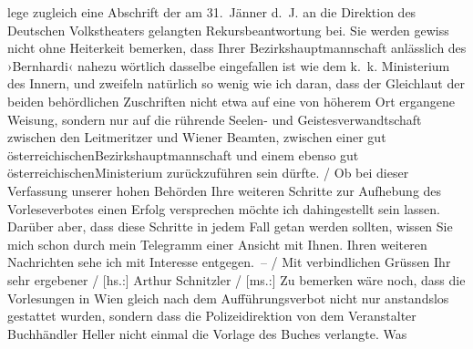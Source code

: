 {{{                        lege zugleich eine Abschrift der am 31. Jänner d. J. an die
                        Direktion des Deutschen Volkstheaters
                        gelangten Rekursbeantwortung bei. Sie werden gewiss nicht ohne Heiterkeit
                        bemerken, dass Ihrer Bezirkshauptmannschaft anlässlich des ›Bernhardi‹ nahezu wörtlich dasselbe eingefallen ist
                        wie dem k. k. Ministerium des Innern,
                        und zweifeln natürlich so wenig wie ich daran, dass der Gleichlaut der
                        beiden behördlichen Zuschriften nicht etwa auf eine von höherem Ort
                        ergangene Weisung, sondern nur auf die rührende Seelen- und
                        Geistesverwandtschaft zwischen den Leitmeritzer und Wiener Beamten,
                        zwischen einer gut österreichischenBezirkshauptmannschaft und einem ebenso gut österreichischenMinisterium
                        zurückzuführen sein dürfte.{ / }Ob bei dieser Verfassung unserer hohen
                        Behörden Ihre weiteren Schritte zur Aufhebung des Vorleseverbotes einen
                        Erfolg versprechen möchte ich dahingestellt sein lassen. Darüber aber, dass
                        diese Schritte in jedem Fall getan werden sollten, wissen Sie mich schon
                        durch mein Telegramm einer Ansicht mit Ihnen. Ihren weiteren Nachrichten
                        sehe ich mit Interesse entgegen. –{ / }Mit verbindlichen Grüssen Ihr sehr ergebener{ / }{[}hs.:{]} Arthur Schnitzler{ / }{[}ms.:{]} Zu bemerken wäre noch, dass die Vorlesungen
                        in Wien gleich nach dem Aufführungsverbot
                        nicht nur anstandslos gestattet wurden, sondern dass die Polizeidirektion von dem Veranstalter Buchhändler Heller nicht einmal die Vorlage des Buches verlangte. Was
}}}
